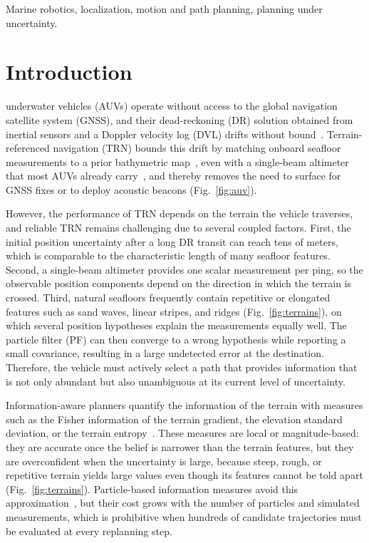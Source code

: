 \documentclass[letterpaper, 10 pt, journal, twoside]{IEEEtran}
\begin{document}
\begin{IEEEkeywords}
Marine robotics, localization, motion and path planning, planning under uncertainty.
\end{IEEEkeywords}

\section{Introduction}
\label{sec:intro}
 underwater vehicles (AUVs) operate without access to the global navigation satellite system (GNSS), and their dead-reckoning (DR) solution obtained from inertial sensors and a Doppler velocity log (DVL) drifts without bound~\cite{paull2014auv}. Terrain-referenced navigation (TRN) bounds this drift by matching onboard seafloor measurements to a prior bathymetric map~\cite{bergman1999terrain, carreno2010survey, melo2017survey}, even with a single-beam altimeter that most AUVs already carry~\cite{kim2014nonlinear, claus2015terrain, salavasidis2019terrain}, and thereby removes the need to surface for GNSS fixes or to deploy acoustic beacons (Fig.~\ref{fig:auv}).

However, the performance of TRN depends on the terrain the vehicle traverses, and reliable TRN remains challenging due to several coupled factors. First, the initial position uncertainty after a long DR transit can reach tens of meters, which is comparable to the characteristic length of many seafloor features. Second, a single-beam altimeter provides one scalar measurement per ping, so the observable position components depend on the direction in which the terrain is crossed. Third, natural seafloors frequently contain repetitive or elongated features such as sand waves, linear stripes, and ridges (Fig.~\ref{fig:terrains}), on which several position hypotheses explain the measurements equally well. The particle filter (PF) can then converge to a wrong hypothesis while reporting a small covariance, resulting in a large undetected error at the destination. Therefore, the vehicle must actively select a path that provides information that is not only abundant but also unambiguous at its current level of uncertainty.

Information-aware planners quantify the information of the terrain with measures such as the Fisher information of the terrain gradient, the elevation standard deviation, or the terrain entropy~\cite{tichavsky1998posterior, wang2015construction, prentice2009belief, hausler2013cooperative}. These measures are local or magnitude-based: they are accurate once the belief is narrower than the terrain features, but they are overconfident when the uncertainty is large, because steep, rough, or repetitive terrain yields large values even though its features cannot be told apart (Fig.~\ref{fig:terrains}). Particle-based information measures avoid this approximation~\cite{hoffmann2010mobile, ryan2010particle}, but their cost grows with the number of particles and simulated measurements, which is prohibitive when hundreds of candidate trajectories must be evaluated at every replanning step.
\end{document}
